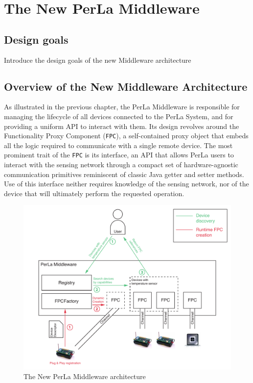 \chapter{The New PerLa Middleware}
\label{cha:middleware_overview}

\section{Design goals}

Introduce the design goals of the new Middleware architecture

\section{Overview of the New Middleware Architecture}

As illustrated in the previous chapter, the PerLa Middleware is responsible for
managing the lifecycle of all devices connected to the PerLa System, and for
providing a uniform API to interact with them. Its design revolves around the
Functionality Proxy Component (\texttt{FPC}), a self-contained proxy object
that embeds all the logic required to communicate with a single remote device.
The most prominent trait of the \texttt{FPC} is its interface, an API that
allows PerLa users to interact with the sensing network through a compact set
of hardware-agnostic communication primitives reminiscent of classic Java
getter and setter methods. Use of this interface neither requires knowledge of
the sensing network, nor of the device that will ultimately perform the
requested operation.

\begin{figure}[h!]
\includegraphics[width=\textwidth]{imgs/middleware_overview.pdf}
\caption{The New PerLa Middleware architecture}
\end{figure}

